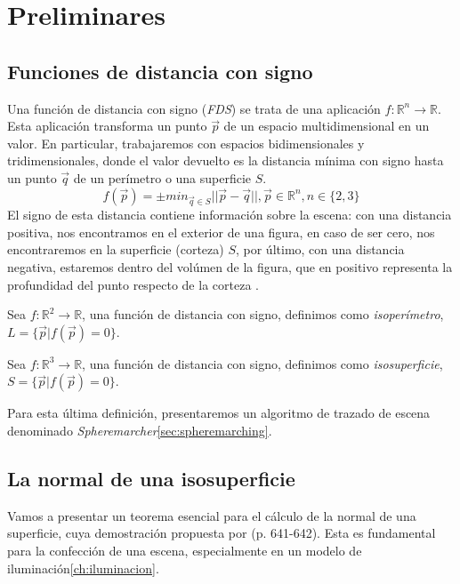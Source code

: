 \chapter{Preliminares}


\section{Funciones de distancia con signo\label{sec:fds}}

Una función de distancia con signo (\textit{FDS}) se trata de una aplicación \(f: \mathbb{R}^n\longrightarrow \mathbb{R}\). Esta aplicación transforma un punto \(\Vec{p}\) de un espacio multidimensional en un valor. En particular, trabajaremos con espacios bidimensionales y tridimensionales, donde el valor devuelto es la distancia mínima con signo hasta un punto \(\Vec{q}\) de un perímetro o una superficie \(S\). 
\[f(\Vec{p})=\pm min_{\Vec{q}\in S}\vert\vert \Vec{p}-\Vec{q} \vert\vert , \Vec{p} \in \mathbb{R}^n, n\in \{2,3\}\]
El signo de esta distancia contiene información sobre la escena: con una distancia positiva, nos encontramos en el exterior de una figura, en caso de ser cero, nos encontraremos en la superficie (corteza) \(S\), por último, con una distancia negativa, estaremos dentro del volúmen de la figura, que en positivo representa la profundidad del punto respecto de la corteza \cite{hart1996sphere}. 

\begin{definition}
	Sea \(f:\mathbb{R}^2\longrightarrow\mathbb{R}\), una función de distancia con signo, definimos como \textit{isoperímetro}, \(L=\{\Vec{p} \vert f(\Vec{p})=0\}\).
\end{definition}

\begin{definition}
	Sea \(f:\mathbb{R}^3\longrightarrow\mathbb{R}\), una función de distancia con signo, definimos como \textit{isosuperficie}, \(S=\{\Vec{p} \vert f(\Vec{p})=0\}\).
\end{definition}

Para esta última definición, presentaremos un algoritmo de trazado de escena denominado \textit{Spheremarcher}\ref{sec:spheremarching}.
\newpage
\section{La normal de una isosuperficie \label{sec:normal}}

Vamos a presentar un teorema esencial para el cálculo de la normal de una superficie, cuya demostración propuesta por  \cite{goldman2005curvature} (p. 641-642). Esta es fundamental para la confección de una escena, especialmente en un modelo de iluminación\ref{ch:iluminacion}.

